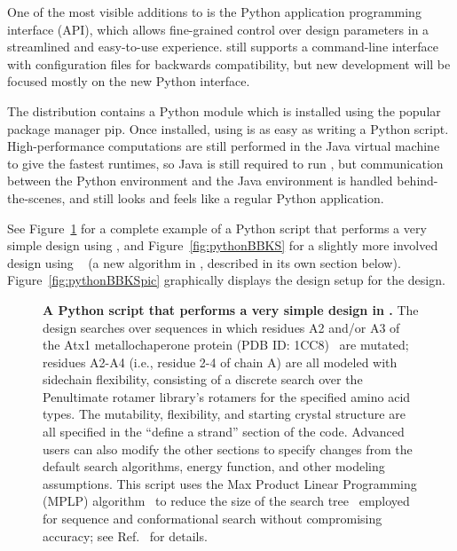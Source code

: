 
One of the most visible additions to  is the Python application programming interface (API), which allows fine-grained control over design parameters in a streamlined and easy-to-use experience.  still supports a command-line interface with configuration files for backwards compatibility, but new development will be focused mostly on the new Python interface. %

The  distribution contains a Python module which is installed using the popular package manager {\sc pip}. Once installed, using  is as easy as writing a Python script. High-performance computations are still performed in the Java virtual machine to give the fastest runtimes, so Java is still required to run , but communication between the Python environment and the Java environment is handled behind-the-scenes, and  still looks and feels like a regular Python application.

See Figure~\ref{fig:pythonGMEC} for a complete example of a Python script that performs a very simple design using , and Figure~\ref{fig:pythonBBKS} for a slightly more involved design using \bbks~\cite{BBK*} (a new algorithm in , described in its own section below).  Figure~\ref{fig:pythonBBKSpic} graphically displays the design setup for the \bbks design.  

\begin{figure}
\vspace{-0.7in}
{
	
}
\caption{\textbf{A Python script that performs a very simple design in .}  The design searches over sequences in which residues A2 and/or A3 of the Atx1 metallochaperone protein (PDB ID: 1CC8)~\cite{1CC8} are mutated; residues A2-A4 (i.e., residue 2-4 of chain A) are all modeled with sidechain flexibility, consisting of a discrete search over the Penultimate rotamer library\cite{penultimate}'s rotamers for the specified amino acid types.  The mutability, flexibility, and starting crystal structure are all specified in the ``define a strand'' section of the code.  Advanced users can also modify the other sections to specify changes from the default search algorithms, energy function, and other modeling assumptions.  This script uses the Max Product Linear Programming (MPLP) algorithm~\cite{MPLP} to reduce the size of the \as search tree~\cite{DEE/A*} employed for sequence and conformational search without compromising accuracy; see Ref.~\cite{dynamic_A*} for details.  }
\label{fig:pythonGMEC}
\end{figure}

